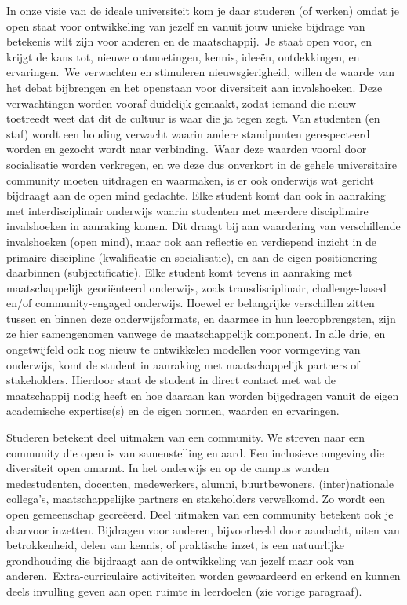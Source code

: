 \documentclass{jote-book}
\begin{document}
	In onze visie van de ideale universiteit kom je daar studeren (of werken) omdat je open staat voor ontwikkeling van jezelf en vanuit jouw unieke bijdrage van betekenis wilt zijn voor anderen en de maatschappij. Je staat open voor, en krijgt de kans tot, nieuwe ontmoetingen, kennis, ideeën, ontdekkingen, en ervaringen. We verwachten en stimuleren nieuwsgierigheid, willen de waarde van het debat bijbrengen en het openstaan voor diversiteit aan invalshoeken. Deze verwachtingen worden vooraf duidelijk gemaakt, zodat iemand die nieuw toetreedt weet dat dit de cultuur is waar die ja tegen zegt. Van studenten (en staf) wordt een houding verwacht waarin andere standpunten gerespecteerd worden en gezocht wordt naar verbinding. Waar deze waarden vooral door socialisatie worden verkregen, en we deze dus onverkort in de gehele universitaire community moeten uitdragen en waarmaken, is er ook onderwijs wat gericht bijdraagt aan de open mind gedachte. Elke student komt dan ook in aanraking met interdisciplinair onderwijs waarin studenten met meerdere disciplinaire invalshoeken in aanraking komen. Dit draagt bij aan waardering van verschillende invalshoeken (open mind), maar ook aan reflectie en verdiepend inzicht in de primaire discipline (kwalificatie en socialisatie), en aan de eigen positionering daarbinnen (subjectificatie). Elke student komt tevens in aanraking met maatschappelijk georiënteerd onderwijs, zoals transdisciplinair, challenge-based en/of community-engaged onderwijs. Hoewel er belangrijke verschillen zitten tussen en binnen deze onderwijsformats, en daarmee in hun leeropbrengsten, zijn ze hier samengenomen vanwege de maatschappelijk component. In alle drie, en ongetwijfeld ook nog nieuw te ontwikkelen modellen voor vormgeving van onderwijs, komt de student in aanraking met maatschappelijk partners of stakeholders. Hierdoor staat de student in direct contact met wat de maatschappij nodig heeft en hoe daaraan kan worden bijgedragen vanuit de eigen academische expertise(s) en de eigen normen, waarden en ervaringen.



	Studeren betekent deel uitmaken van een community. We streven naar een community die open is van samenstelling en aard. Een inclusieve omgeving die diversiteit open omarmt. In het onderwijs en op de campus worden medestudenten, docenten, medewerkers, alumni, buurtbewoners, (inter)nationale collega's, maatschappelijke partners en stakeholders verwelkomd. Zo wordt een open gemeenschap gecreëerd. Deel uitmaken van een community betekent ook je daarvoor inzetten. Bijdragen voor anderen, bijvoorbeeld door aandacht, uiten van betrokkenheid, delen van kennis, of praktische inzet, is een natuurlijke grondhouding die bijdraagt aan de ontwikkeling van jezelf maar ook van anderen. Extra-curriculaire activiteiten worden gewaardeerd en erkend en kunnen deels invulling geven aan open ruimte in leerdoelen (zie vorige paragraaf).
\end{document}
